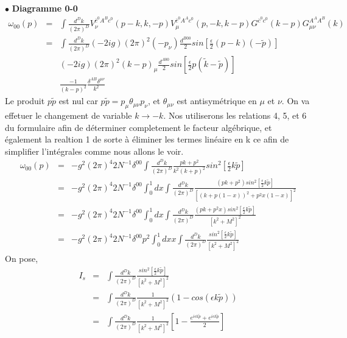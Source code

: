 \documentclass[a4paper,11pt]{article}
\theoremstyle{plain}
\theoremstyle{definition}
\theoremstyle{remark}
\numberwithin{equation}{section}
\numberwithin{equation}{subsection}
\numberwithin{figure}{section}
\begin{document}
$\bullet$ \textbf{ Diagramme 0-0 }
 \begin{eqnarray*}
 \omega_{00}(p) &=&  \int  \frac{d^D k}{(2 \pi)^D}
V_{\nu}^{ \overline{c}^{0} A^{B} c^{0} } (p-k , k , -p )
V_{\mu}^{ \overline{c}^{0} A^{A} c^{0} } (p,-k,k-p )
G^{ \overline{c}^{0} c^{0} } (k-p)
G^{ A^{A} A^{B} }_{\mu \nu } (k)  \\
                              &=&  \int  \frac{d^D k}{(2 \pi)^D}
( -2ig) (2 \pi)^2  (-p_{\nu} )  \frac{d^{B00}}{2} sin \left[ \frac{\epsilon}{2}  (p-k) (- \tilde{p} ) \right]            \\
&&        ( -2ig) (2 \pi)^2 (k-p)_{\mu}   \frac{d^{A00}}{2} sin \left[ \frac{\epsilon}{2}  p ( \tilde{k} - \tilde{p} ) \right]              \\
&&         \frac{-1}{(k-p)^2}
\frac{\delta^{AB} \delta^{\mu \nu}}{k^2}
\end{eqnarray*}
Le produit $p \tilde{p} $ est nul car $p \tilde{p} = p_{\mu} \theta_{\mu \nu} p_{\nu} $, et $\theta_{\mu \nu}$ est antisymétrique en $\mu$ et $\nu$. On va effetuer le changement de variable $k \rightarrow -k$. Nos utiliserons les relations 4, 5, et 6 du formulaire afin de déterminer completement le facteur algébrique, et également la realtion 1 de sorte à éliminer les termes linéaire en k ce afin de simplifier l'intégrales comme nous allons le voir.
\begin{eqnarray}
 \omega_{00}(p)  &=&  - g^2  (2 \pi)^4  2N^{-1}  \delta^{00}
\int  \frac{d^D k}{(2 \pi)^D}
\frac{pk + p^2}{k^2(k+p)^2}
sin^2 \left[ \frac{\epsilon}{2} k \tilde{p} \right]  \\
                              &=&  - g^2  (2 \pi)^4  2N^{-1}   \delta^{00}
\int_{0}^{1}  dx
\int  \frac{d^D k}{(2 \pi)^D}
\frac{(pk + p^2)  sin^2 \left[ \frac{\epsilon}{2} k \tilde{p} \right] }{\left[ (k+p(1-x))^2  +  p^2 x(1-x) \right]^2}  \\
                              &=&  - g^2  (2 \pi)^4  2N^{-1}    \delta^{00}
\int_{0}^{1}  dx
\int  \frac{d^D k}{(2 \pi)^D}
\frac{(pk + p^2 x)  sin^2 \left[ \frac{\epsilon}{2} k \tilde{p} \right] }{\left[ k^2  +  M^2 \right]^2}  \\
                              &=&  - g^2  (2 \pi)^4  2N^{-1}    \delta^{00} p^{2}
\int_{0}^{1}  dx x
\int  \frac{d^D k}{(2 \pi)^D}
\frac{sin^2 \left[ \frac{\epsilon}{2} k \tilde{p} \right] }{\left[ k^2  +  M^2 \right]^2}  
\end{eqnarray}
On pose,
\begin{eqnarray}
 I_{s} &=& \int  \frac{d^D k}{(2 \pi)^D}
\frac{sin^2 \left[ \frac{\epsilon}{2} k \tilde{p} \right] }{\left[ k^2  +  M^2  \right]^2}  \\
       &=&  \int  \frac{d^D k}{(2 \pi)^D}
\frac{1}{\left[ k^2  +  M^2 \right]^2} 
 \left( 1 - cos ( \epsilon k \tilde{p} ) \right) \\
                              &=&  \int  \frac{d^D k}{(2 \pi)^D}
\frac{1 }{\left[ k^2  +  M^2 \right]^2} 
 \left[ 1 - \frac{e^{ i \epsilon k \tilde{p} }   +   e^{i \epsilon k \tilde{p} } }{ 2 }  \right]
\end{eqnarray}
\end{document}
